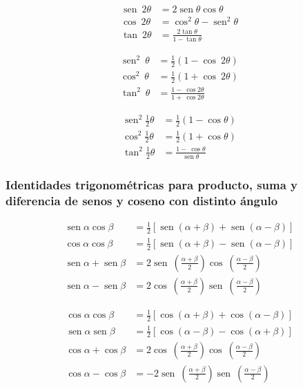 \documentclass[11pt,letterpaper,oneside]{book}
\numberwithin{equation}{section}
\renewcommand{\sin}{\operatorname{sen}}
\begin{document}
	\begin{minipage}{0.32\textwidth}
		\begin{align}
			\sin\ 2\theta &= 2 \sin \theta \cos \theta \\
			\cos\ 2\theta &= \cos^2 \theta - \sin^2 \theta \\
			\tan\ 2\theta &= \tfrac{2 \tan \theta}{1-\tan \theta}
 		\end{align}
	\end{minipage}
	\begin{minipage}{0.32\textwidth}
		\begin{align}
			\sin^2\ \theta &= \tfrac{1}{2} (1-\cos\ 2\theta) \\
			\cos^2\ \theta &= \tfrac{1}{2} (1 + \cos\ 2\theta ) \\
			\tan^2 \ \theta &= \tfrac{1- \ \cos 2\theta}{1 +\ \cos 2\theta}
 		\end{align}
	\end{minipage}
	\begin{minipage}{0.32\textwidth}
		\begin{align}
			\sin^2 \tfrac{1}{2} \theta &= \tfrac{1}{2} (1-\cos \theta) \\
			\cos^2 \tfrac{1}{2} \theta &= \tfrac{1}{2} (1+\cos \theta) \\
			\tan^2 \tfrac{1}{2} \theta &= \tfrac{1-\ \cos \theta}{\sin \theta}
		\end{align}
	\end{minipage}

	\subsubsection{Identidades trigonométricas para producto, suma y diferencia de senos y coseno con distinto ángulo}
	\begin{minipage}{0.48\textwidth}
		\begin{align}
			\sin \alpha \cos \beta &= \tfrac{1}{2} [\sin (\alpha + \beta) + \sin (\alpha - \beta)] \\
			\cos \alpha \cos \beta &= \tfrac{1}{2} [\sin (\alpha + \beta) - \sin (\alpha - \beta)] \\
			\sin \alpha + \sin \beta &= 2 \sin\ (\tfrac{\alpha + \beta}{2}) \cos\ (\tfrac{\alpha - \beta}{2}) \\
			\sin \alpha - \sin \beta &= 2 \cos\ (\tfrac{\alpha + \beta}{2}) \sin\ (\tfrac{\alpha - \beta}{2})	
		\end{align}
	\end{minipage}
	\begin{minipage}{0.48\textwidth}
		\begin{align}
			\cos \alpha \cos \beta &= \tfrac{1}{2} [\cos (\alpha + \beta) + \cos (\alpha - \beta)] \\
			\sin \alpha \sin \beta &= \tfrac{1}{2} [\cos (\alpha - \beta) - \cos (\alpha + \beta)] \\
			\cos \alpha + \cos \beta &= 2 \cos\ (\tfrac{\alpha + \beta}{2}) \cos\ (\tfrac{\alpha - \beta}{2}) \\
			\cos \alpha - \cos \beta &= -2 \sin\ (\tfrac{\alpha + \beta}{2}) \sin\ (\tfrac{\alpha - \beta}{2})
		\end{align}
	\end{minipage}
\end{document}

